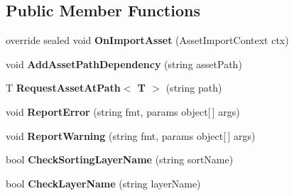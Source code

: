 \subsection*{Public Member Functions}
\begin{DoxyCompactItemize}
\item 
\mbox{\label{class_super_tiled2_unity_1_1_editor_1_1_super_importer_af0f4f92663bff182a77d50c52b382e28}} 
override sealed void {\bfseries On\+Import\+Asset} (Asset\+Import\+Context ctx)
\item 
\mbox{\label{class_super_tiled2_unity_1_1_editor_1_1_super_importer_ac4e5b422fb52ed85843005e8f9e53c7d}} 
void {\bfseries Add\+Asset\+Path\+Dependency} (string asset\+Path)
\item 
\mbox{\label{class_super_tiled2_unity_1_1_editor_1_1_super_importer_a3ce7256c69249feb7f4d3dffda449ccc}} 
T {\bfseries Request\+Asset\+At\+Path$<$ T $>$} (string path)
\item 
\mbox{\label{class_super_tiled2_unity_1_1_editor_1_1_super_importer_aaca5e1fab2ba74d0261fb28fb82afcd7}} 
void {\bfseries Report\+Error} (string fmt, params object\mbox{[}$\,$\mbox{]} args)
\item 
\mbox{\label{class_super_tiled2_unity_1_1_editor_1_1_super_importer_a91246549b608d9e2ffde30fb233c8cd4}} 
void {\bfseries Report\+Warning} (string fmt, params object\mbox{[}$\,$\mbox{]} args)
\item 
\mbox{\label{class_super_tiled2_unity_1_1_editor_1_1_super_importer_a1f56bba33db4b1918a5f38bbe91c7ab0}} 
bool {\bfseries Check\+Sorting\+Layer\+Name} (string sort\+Name)
\item 
\mbox{\label{class_super_tiled2_unity_1_1_editor_1_1_super_importer_a4593955181f8c26ed792cffa6fe00889}} 
bool {\bfseries Check\+Layer\+Name} (string layer\+Name)
\end{DoxyCompactItemize}
